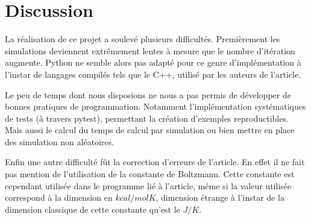 \section{Discussion}

La réalisation de ce projet a soulevé plusieurs difficultés. Premièrement les simulations deviennent extrêmement lentes à mesure que le nombre d'itération augmente. Python ne semble alors pas adapté pour ce genre d'implémentation à l'instar de langages compilés tels que le C++, utilisé par les auteurs de l'article.

Le peu de temps dont nous disposions ne nous a pas permis de développer de bonnes pratiques de programmation. Notamment l'implémentation systématiques de tests (à travers pytest), permettant la création d'exemples reproductibles. Mais aussi le calcul du temps de calcul par simulation ou bien mettre en place des simulation non aléatoires.

Enfin une autre difficulté fût la correction d'erreurs de l'article. En effet il ne fait pas mention de l'utilisation de la constante de Boltzmann. Cette constante est cependant utilisée dans le programme lié à l'article, même si la valeur utilisée correspond à la dimension en $kcal/molK$, dimension étrange à l'instar de la dimension classique de cette constante qu'est le $J/K$.
